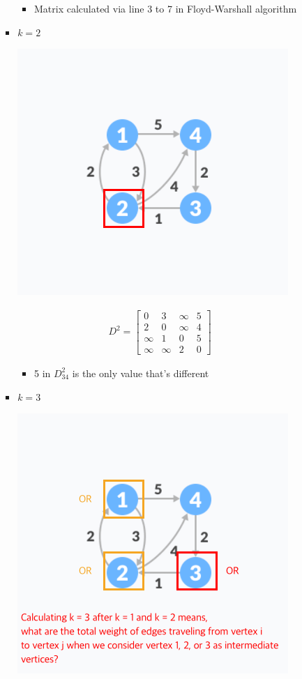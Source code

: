 \documentclass[12pt]{article}
\begin{document}
\begin{enumerate}[1.]
\begin{itemize}
\begin{itemize}
\begin{itemize}
                \begin{itemize}
                    \item Matrix calculated via line 3 to 7 in Floyd-Warshall algorithm
                \end{itemize}

                \item $k = 2$

                \begin{center}
                \includegraphics[width=0.5\linewidth]{images/worksheet_4_solution_49.png}
                \end{center}

                \begin{align}
                    D^2 = \begin{bmatrix}
                        0 & 3 & \infty & 5\\
                        2 & 0 & \infty & 4\\
                        \infty & 1 & 0 & 5\\
                        \infty & \infty & 2 & 0
                    \end{bmatrix}
                \end{align}

                \begin{itemize}
                    \item 5 in $D^2_{34}$ is the only value that's different
                \end{itemize}

                \item $k = 3$

                \begin{center}
                \includegraphics[width=0.5\linewidth]{images/worksheet_4_solution_50.png}
                \end{center}


\end{itemize}
\end{itemize}
\end{itemize}
\end{enumerate}
\end{document}
